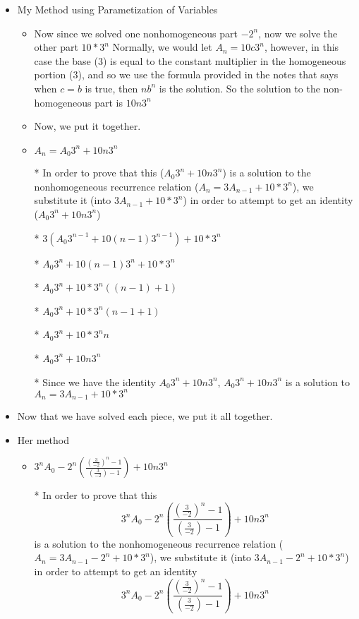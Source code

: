 \documentclass{article}
\begin{document}
\begin{enumerate}
\begin{enumerate}
\begin{itemize}
\begin{itemize}
      \end{itemize} %
    \item My Method using Parametization of Variables
      \begin{itemize} %
      \item Now since we solved one nonhomogeneous part $-2^{n}$, now we solve the other part $10*3^{n}$ Normally, we would let $A_{n}=10c3^{n}$, however, in this case the base ($3$) is equal to the constant multiplier in the homogeneous portion ($3$), and so we use the formula provided in the notes that says when $c=b$ is true, then $nb^{n}$ is the solution. So the solution to the non-homogeneous part is $10n3^{n}$
      \item Now, we put it together.
      \item $A_{n}=A_{0}3^{n}+10n3^{n}$
      \item [*] In order to prove that this ($A_{0}3^{n}+10n3^{n}$) is a solution to the nonhomogeneous recurrence relation ($A_{n}=3A_{n-1}+10*3^{n}$), we substitute it (into $3A_{n-1}+10*3^{n}$) in order to attempt to get an identity ($A_{0}3^{n}+10n3^{n}$)
      \item [*] $3(A_{0}3^{n-1}+10(n-1)3^{n-1})+10*3^{n}$
      \item [*] $A_{0}3^{n}+10(n-1)3^{n}+10*3^{n}$
      \item [*] $A_{0}3^{n}+10*3^{n}((n-1)+1)$
      \item [*] $A_{0}3^{n}+10*3^{n}(n-1+1)$
      \item [*] $A_{0}3^{n}+10*3^{n}n$
      \item [*] $A_{0}3^{n}+10n3^{n}$
      \item [*] Since we have the identity $A_{0}3^{n}+10n3^{n}$, $A_{0}3^{n}+10n3^{n}$ is a solution to $A_{n}=3A_{n-1}+10*3^{n}$
      \end{itemize} %
    \item Now that we have solved each piece, we put it all together.
    \item Her method
      \begin{itemize} %
      \item $3^{n}A_{0} -2^{n}\left(\frac{\left(\frac{3}{-2}\right)^{n}-1}{\left(\frac{3}{-2}\right)-1}\right) +10n3^{n}$
      \item [*] In order to prove that this $$3^{n}A_{0} -2^{n}\left(\frac{\left(\frac{3}{-2}\right)^{n}-1}{\left(\frac{3}{-2}\right)-1}\right) +10n3^{n}$$ is a solution to the nonhomogeneous recurrence relation ($A_{n}=3A_{n-1}-2^{n}+10*3^{n}$), we substitute it (into $3A_{n-1}-2^{n}+10*3^{n}$) in order to attempt to get an identity $$3^{n}A_{0} -2^{n}\left(\frac{\left(\frac{3}{-2}\right)^{n}-1}{\left(\frac{3}{-2}\right)-1}\right) +10n3^{n}$$

\end{itemize}
\end{itemize}
\end{enumerate}
\end{enumerate}
\end{document}
